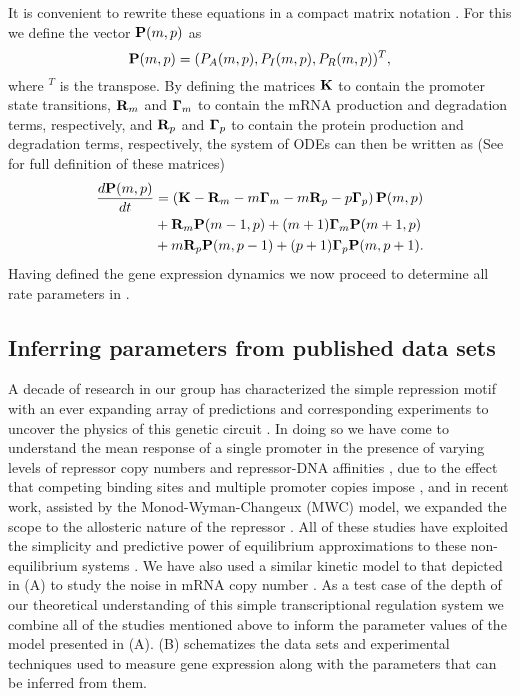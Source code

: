 It is convenient to rewrite these equations in a compact matrix notation
\cite{Sanchez2013}. For this we define the vector $\mathbf{P}(m, p)$ as
\begin{equation}
  \mathbf{P}(m, p) = (P_A(m, p), P_I(m, p), P_R(m, p))^T,
\end{equation}
where $^T$ is the transpose. By defining the matrices $\mathbf{K}$ to contain the
promoter state transitions, $\mathbf{R}_m$ and $\mathbf{\Gamma}_m$ to contain the mRNA production and
degradation terms, respectively, and $\mathbf{R}_p$ and $\mathbf{\Gamma}_p$ to contain the protein
production and degradation terms, respectively, the system of ODEs can then be
written as (See  for full definition of these matrices)
\begin{equation}
  \begin{aligned}
    {d{\mathbf{P}(m, p)} \over dt} &= \left( \mathbf{K} -\mathbf{R}_m -m\mathbf{\Gamma}_m -m\mathbf{R}_p -p\mathbf{\Gamma}_p \right) \mathbf{P}(m, p)\\
    &+ \mathbf{R}_m \mathbf{P}(m-1, p)
    + (m + 1) \mathbf{\Gamma}_m \mathbf{P}(m + 1, p)\\
    &+ m \mathbf{R}_p \mathbf{P}(m, p - 1)
    + (p + 1) \mathbf{\Gamma}_p \mathbf{P}(m, p + 1).
  \end{aligned}
  \label{eq_cme_matrix}
\end{equation}
Having defined the gene expression dynamics we now proceed to determine all 
rate parameters in .

\subsection{Inferring parameters from published data sets}
\label{sec_param}

A decade of research in our group has characterized the simple repression motif
with an ever expanding array of predictions and corresponding experiments to
uncover the physics of this genetic circuit \cite{Phillips2019}. In doing so we
have come to understand the mean response of a single promoter in the presence
of varying levels of repressor copy numbers and repressor-DNA affinities
\cite{Garcia2011c}, due to the effect that competing binding sites and multiple
promoter copies impose \cite{Brewster2014}, and in recent work, assisted by the
Monod-Wyman-Changeux (MWC) model, we expanded the scope to the allosteric
nature of the repressor \cite{Razo-Mejia2018}. All of these studies have
exploited the simplicity and predictive power of equilibrium approximations to
these non-equilibrium systems \cite{Buchler2003}. We have also used a similar
kinetic model to that depicted in (A) to study the
noise in mRNA copy number \cite{Jones2014a}. As a test case of the depth of our
theoretical understanding of this simple transcriptional regulation system we
combine all of the studies mentioned above to inform the parameter values of
the model presented in (A).
(B) schematizes the data sets and experimental
techniques used to measure gene expression along with the parameters that can
be inferred from them.

